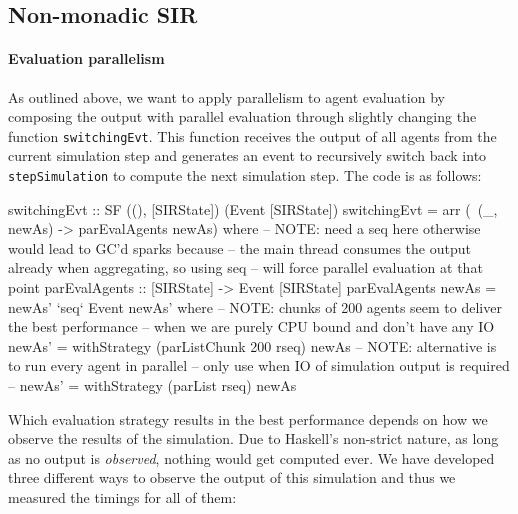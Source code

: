 \subsection{Non-monadic SIR}
\label{parallel_nonmonadic_sir}

\paragraph{Evaluation parallelism}
As outlined above, we want to apply parallelism to agent evaluation by composing the output with parallel evaluation through slightly changing the function \texttt{switchingEvt}. This function receives the output of all agents from the current simulation step and generates an event to recursively switch back into \texttt{stepSimulation} to compute the next simulation step. The code is as follows:

\begin{HaskellCode}
switchingEvt :: SF ((), [SIRState]) (Event [SIRState])
switchingEvt = arr (\ (_, newAs) -> parEvalAgents newAs)
  where
    -- NOTE: need a seq here otherwise would lead to GC'd sparks because
    -- the main thread consumes the output already when aggregating, so using seq 
    -- will force parallel evaluation at that point 
    parEvalAgents :: [SIRState] -> Event [SIRState]
    parEvalAgents newAs = newAs' `seq` Event newAs' 
      where
        -- NOTE: chunks of 200 agents seem to deliver the best performance
        -- when we are purely CPU bound and don't have any IO
        newAs' = withStrategy (parListChunk 200 rseq) newAs
        -- NOTE: alternative is to run every agent in parallel
        -- only use when IO of simulation output is required
        -- newAs' = withStrategy (parList rseq) newAs
\end{HaskellCode}

Which evaluation strategy results in the best performance depends on how we observe the results of the simulation. Due to Haskell's non-strict nature, as long as no output is \textit{observed}, nothing would get computed ever. We have developed three different ways to observe the output of this simulation and thus we measured the timings for all of them:


